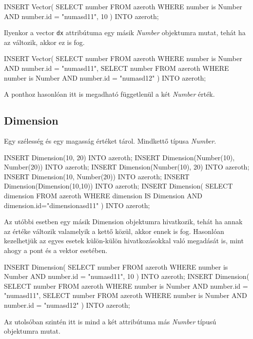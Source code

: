 \begin{sql}
INSERT Vector(
    SELECT number FROM azeroth
    WHERE number is Number AND number.id = "numasd11", 10
) INTO azeroth;
\end{sql}

Ilyenkor a vector \texttt{dx} attribútuma egy másik \textit{Number} objektumra mutat, tehát ha az változik, akkor ez is fog.

\begin{sql}
INSERT Vector(
    SELECT number FROM azeroth
    WHERE number is Number AND number.id = "numasd11",
    SELECT number FROM azeroth
    WHERE number is Number AND number.id = "numasd12"
) INTO azeroth;
\end{sql}

A ponthoz hasonlóan itt is megadható függetlenül a két \textit{Number} érték.

\subsection{Dimension}

Egy szélesség és egy magasság értéket tárol. Mindkettő típusa \textit{Number}.

\begin{sql}
INSERT Dimension(10, 20) INTO azeroth;
INSERT Dimension(Number(10), Number(20)) INTO azeroth;
INSERT Dimension(Number(10), 20) INTO azeroth;
INSERT Dimension(10, Number(20)) INTO azeroth;
INSERT Dimension(Dimension(10,10)) INTO azeroth;
INSERT Dimension(
    SELECT dimension FROM azeroth
    WHERE dimension IS Dimension AND dimension.id="dimensionasd11"
) INTO azeroth;
\end{sql}

Az utóbbi esetben egy másik Dimension objektumra hivatkozik, tehát ha annak az értéke változik valamelyik a kettő közül, akkor ennek is fog. Hasonlóan kezelhetjük az egyes esetek külön-külön hivatkozásokkal való megadását is, mint ahogy a pont és a vektor esetében.

\begin{sql}
INSERT Dimension(
    SELECT number FROM azeroth
    WHERE number is Number AND number.id = "numasd11", 10
) INTO azeroth;
INSERT Dimension(
    SELECT number FROM azeroth
    WHERE number is Number AND number.id = "numasd11",
    SELECT number FROM azeroth
    WHERE number is Number AND number.id = "numasd12"
) INTO azeroth;
\end{sql}

Az utolsóban szintén itt is mind a két attribútuma más \textit{Number} típusú objektumra mutat.

